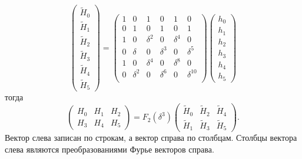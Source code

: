 \[
    \begin{pmatrix}
        \widetilde{H}_0 \\
        \widetilde{H}_1 \\
        \widetilde{H}_2 \\
        \widetilde{H}_3 \\
        \widetilde{H}_4 \\
        \widetilde{H}_5
    \end{pmatrix}
    =
    \begin{pmatrix}
        1 & 0        & 1        & 0        & 1        & 0           \\
        0 & 1        & 0        & 1        & 0        & 1           \\
        1 & 0        & \delta^2 & 0        & \delta^4 & 0           \\
        0 & \delta   & 0        & \delta^3 & 0        & \delta^5    \\
        1 & 0        & \delta^4 & 0        & \delta^8 & 0           \\
        0 & \delta^2 & 0        & \delta^6 & 0        & \delta^{10} \\
    \end{pmatrix}
    \begin{pmatrix}
        h_0 \\
        h_1 \\
        h_2 \\
        h_3 \\
        h_4 \\
        h_5
    \end{pmatrix}
\]
тогда
\[
    \begin{pmatrix}
        H_0 & H_1 & H_2 \\
        H_3 & H_4 & H_5
    \end{pmatrix}
    =
    F_2(\delta^3)
    \begin{pmatrix}
        \widetilde{H}_0 & \widetilde{H}_2 & \widetilde{H}_4 \\
        \widetilde{H}_1 & \widetilde{H}_3 & \widetilde{H}_5
    \end{pmatrix} .
\]
Вектор слева записан по строкам, а вектор справа по столбцам. Столбцы вектора слева являются преобразованиями Фурье векторов справа.

